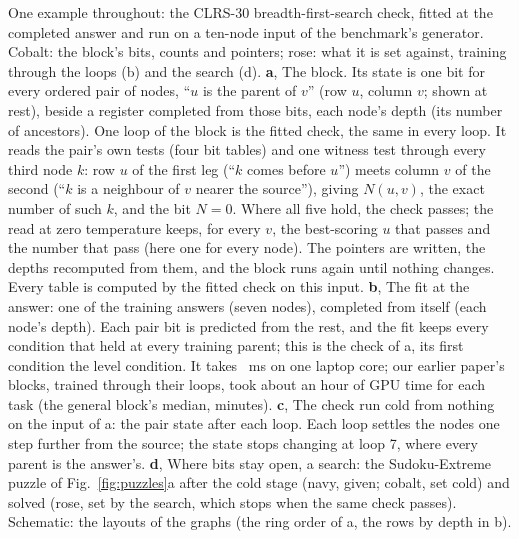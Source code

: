  One example throughout: the CLRS-30 breadth-first-search check,
fitted at the completed answer and run on a ten-node input of the benchmark's generator. Cobalt: the block's bits,
counts and pointers; rose: what it is set against, training through the loops (b) and the search (d). \textbf{a}, The
block. Its state is one bit for every ordered pair of nodes, ``$u$ is the parent of $v$'' (row $u$, column $v$; shown at
rest), beside a register completed from those bits, each node's depth (its number of ancestors). One loop of the block
is the fitted check, the same in every loop. It reads the pair's own tests (four bit tables) and one witness test
through every third node $k$: row $u$ of the first leg (``$k$ comes before $u$'') meets column $v$ of the second
(``$k$ is a neighbour of $v$ nearer the source''), giving $N(u,v)$, the exact number of such $k$, and the bit $N=0$.
Where all five hold, the check passes; the read at zero temperature keeps, for every $v$, the best-scoring $u$ that
passes and the number that pass (here one for every node). The pointers are written, the depths recomputed from them,
and the block runs again until nothing changes. Every table is computed by the fitted check on this input.
\textbf{b}, The fit at the answer: one of the  training answers (seven nodes), completed from
itself (each node's depth). Each pair bit is predicted from the rest, and the fit keeps every condition that held at
every training parent; this is the check of a, its first condition the level condition. It takes ~ms
on one laptop core; our earlier paper's blocks, trained through their loops,
took about an hour of GPU time for each task (the general block's median,  minutes). \textbf{c}, The check run cold from nothing on the input of a: the pair state after each loop. Each loop settles
the nodes one step further from the source; the state stops changing at loop 7, where every parent is the answer's.
\textbf{d}, Where bits stay open, a search: the Sudoku-Extreme puzzle of Fig.~\ref{fig:puzzles}a after the cold stage (navy, given;
cobalt, set cold) and solved (rose, set by the search, which stops when the same check passes). Schematic: the
layouts of the graphs (the ring order of a, the rows by depth in b).
